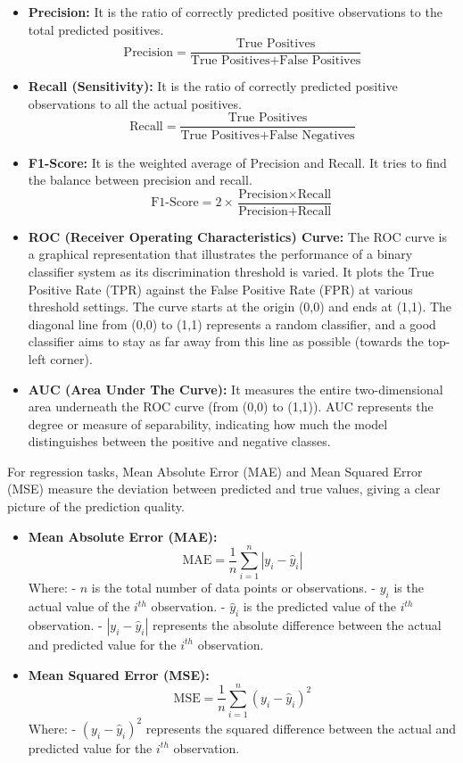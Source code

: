\begin{itemize}
    \item \textbf{Precision:} It is the ratio of correctly predicted positive observations to the total predicted positives.
    \[ \text{Precision} = \frac{\text{True Positives}}{\text{True Positives} + \text{False Positives}} \]

    \item \textbf{Recall (Sensitivity):} It is the ratio of correctly predicted positive observations to all the actual positives.
    \[ \text{Recall} = \frac{\text{True Positives}}{\text{True Positives} + \text{False Negatives}} \]

    \item \textbf{F1-Score:} It is the weighted average of Precision and Recall. It tries to find the balance between precision and recall.
    \[ \text{F1-Score} = 2 \times \frac{\text{Precision} \times \text{Recall}}{\text{Precision} + \text{Recall}} \]

    \item \textbf{ROC (Receiver Operating Characteristics) Curve:} The ROC curve is a graphical representation that illustrates the performance of a binary classifier system as its discrimination threshold is varied. It plots the True Positive Rate (TPR) against the False Positive Rate (FPR) at various threshold settings. The curve starts at the origin (0,0) and ends at (1,1). The diagonal line from (0,0) to (1,1) represents a random classifier, and a good classifier aims to stay as far away from this line as possible (towards the top-left corner).

    \item \textbf{AUC (Area Under The Curve):} It measures the entire two-dimensional area underneath the ROC curve (from (0,0) to (1,1)). AUC represents the degree or measure of separability, indicating how much the model distinguishes between the positive and negative classes.
\end{itemize}

For regression tasks, Mean Absolute Error (MAE) and Mean Squared Error (MSE) measure the deviation between predicted and true values, giving a clear picture of the prediction quality.

\begin{itemize}
    \item \textbf{Mean Absolute Error (MAE):}
    \[ \text{MAE} = \frac{1}{n} \sum_{i=1}^{n} |y_i - \hat{y}_i| \]
    Where:
    - \( n \) is the total number of data points or observations.
    - \( y_i \) is the actual value of the \( i^{th} \) observation.
    - \( \hat{y}_i \) is the predicted value of the \( i^{th} \) observation.
    - \( |y_i - \hat{y}_i| \) represents the absolute difference between the actual and predicted value for the \( i^{th} \) observation.

    \item \textbf{Mean Squared Error (MSE):}
    \[ \text{MSE} = \frac{1}{n} \sum_{i=1}^{n} (y_i - \hat{y}_i)^2 \]
    Where:
    - \( (y_i - \hat{y}_i)^2 \) represents the squared difference between the actual and predicted value for the \( i^{th} \) observation.
\end{itemize}
